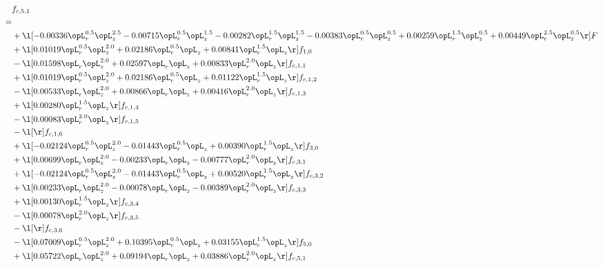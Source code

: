 \begin{alignat}{2} 
\label{eq:f_51_1} 
& f_{c,5,1} \nonumber \\ 
 = \\ 
& + \l[  -0.00336 \opL_r^{0.5} \opL_z^{2.5}   -0.00715 \opL_r^{0.5} \opL_z^{1.5}   -0.00282 \opL_r^{1.5} \opL_z^{1.5}   -0.00383 \opL_r^{0.5} \opL_z^{0.5} +  0.00259 \opL_r^{1.5} \opL_z^{0.5} +  0.00449 \opL_r^{2.5} \opL_z^{0.5}  \r] F \nonumber \\ 
& + \l[  0.01019 \opL_r^{0.5} \opL_z^{2.0} +  0.02186 \opL_r^{0.5} \opL_z +  0.00841 \opL_r^{1.5} \opL_z  \r] f_{1,0} \nonumber \\ 
& - \l[  0.01598 \opL_r \opL_z^{2.0} +  0.02597 \opL_r \opL_z +  0.00833 \opL_r^{2.0} \opL_z  \r] f_{c,1,1} \nonumber \\ 
& + \l[  0.01019 \opL_r^{0.5} \opL_z^{2.0} +  0.02186 \opL_r^{0.5} \opL_z +  0.01122 \opL_r^{1.5} \opL_z  \r] f_{c,1,2} \nonumber \\ 
& - \l[  0.00533 \opL_r \opL_z^{2.0} +  0.00866 \opL_r \opL_z +  0.00416 \opL_r^{2.0} \opL_z  \r] f_{c,1,3} \nonumber \\ 
& + \l[  0.00280 \opL_r^{1.5} \opL_z  \r] f_{c,1,4} \nonumber \\ 
& - \l[  0.00083 \opL_r^{2.0} \opL_z  \r] f_{c,1,5} \nonumber \\ 
& - \l[  \r] f_{c,1,6} \nonumber \\ 
& + \l[  -0.02124 \opL_r^{0.5} \opL_z^{2.0}   -0.01443 \opL_r^{0.5} \opL_z +  0.00390 \opL_r^{1.5} \opL_z  \r] f_{3,0} \nonumber \\ 
& + \l[  0.00699 \opL_r \opL_z^{2.0}   -0.00233 \opL_r \opL_z   -0.00777 \opL_r^{2.0} \opL_z  \r] f_{c,3,1} \nonumber \\ 
& + \l[  -0.02124 \opL_r^{0.5} \opL_z^{2.0}   -0.01443 \opL_r^{0.5} \opL_z +  0.00520 \opL_r^{1.5} \opL_z  \r] f_{c,3,2} \nonumber \\ 
& + \l[  0.00233 \opL_r \opL_z^{2.0}   -0.00078 \opL_r \opL_z   -0.00389 \opL_r^{2.0} \opL_z  \r] f_{c,3,3} \nonumber \\ 
& + \l[  0.00130 \opL_r^{1.5} \opL_z  \r] f_{c,3,4} \nonumber \\ 
& - \l[  0.00078 \opL_r^{2.0} \opL_z  \r] f_{c,3,5} \nonumber \\ 
& - \l[  \r] f_{c,3,6} \nonumber \\ 
& - \l[  0.07009 \opL_r^{0.5} \opL_z^{2.0} +  0.10395 \opL_r^{0.5} \opL_z +  0.03155 \opL_r^{1.5} \opL_z  \r] f_{5,0} \nonumber \\ 
& + \l[  0.05722 \opL_r \opL_z^{2.0} +  0.09194 \opL_r \opL_z +  0.03886 \opL_r^{2.0} \opL_z  \r] f_{c,5,1} \nonumber \\ 

\end{alignat}
